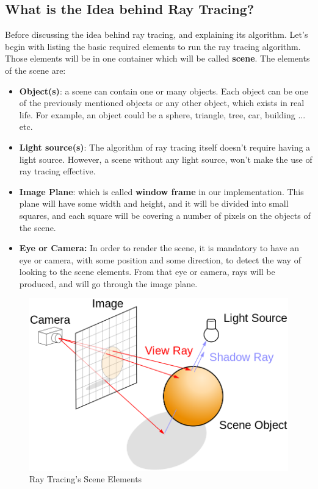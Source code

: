 \documentclass{article}
\begin{document}
	\subsection{What is the Idea behind  Ray Tracing?}
	Before discussing the idea behind ray tracing, and explaining its algorithm. Let's begin with listing the basic required elements to run the ray tracing algorithm. Those elements will be in one container which will be called \textbf{scene}. The elements of the scene are:
	\begin{itemize}
		\item \textbf{Object(s)}: a scene can contain one or many objects. Each object can be one of the previously mentioned objects or any other object, which exists in real life. For example, an object could be a sphere, triangle, tree, car, building ... etc.
		\item \textbf{Light source(s)}: The algorithm of ray tracing itself doesn't require having a light source. However, a scene without any light source, won't make the use of ray tracing effective.
		\item \textbf{Image Plane}: which is called \textbf{window frame} in our implementation. This plane will have some width and height, and it will be divided into small squares, and each square will be covering a number of pixels on the objects of the scene.
		\item \textbf{Eye or Camera:} In order to render the scene, it is mandatory to have an eye or camera, with some position and some direction, to detect the way of looking to the scene elements. From that eye or camera, rays will be produced, and will go through the image plane.
	\end{itemize}
	\begin{figure}[ht!]
		\centering
		\includegraphics[scale=0.30]{./raytracing.png}
		\caption{Ray Tracing's Scene Elements \cite{raytracingpic}}
		\label{fig:raytracing}
	\end{figure}
\end{document}
